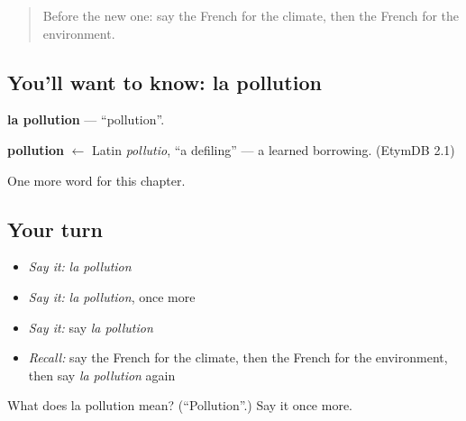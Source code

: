 \begin{quote}
Before the new one: say the French for the climate, then the French for the environment.
\end{quote}

\subsection*{You'll want to know: la pollution}
\textbf{la pollution} — \textquotedblleft{}pollution\textquotedblright{}.

\begin{cousinweb}
\textbf{pollution} $\leftarrow$ Latin \emph{pollutio}, \textquotedblleft{}a defiling\textquotedblright{} — a learned borrowing. (EtymDB 2.1)
\end{cousinweb}

\begin{grammarlens}[title={What you've built}]
One more word for this chapter.
\end{grammarlens}

\subsection*{Your turn}
\begin{itemize}
\raggedright
  \item \emph{Say it:} \emph{la pollution}
  \item \emph{Say it:} \emph{la pollution}, once more
  \item \emph{Say it:} say \emph{la pollution}
  \item \emph{Recall:} say the French for the climate, then the French for the environment, then say \emph{la pollution} again
\end{itemize}

\begin{tcolorbox}[breakable,colback=teal!4,colframe=teal!35!black,title={Before you move on}]
What does la pollution mean? (\textquotedblleft{}Pollution\textquotedblright{}.) Say it once more.
\end{tcolorbox}
